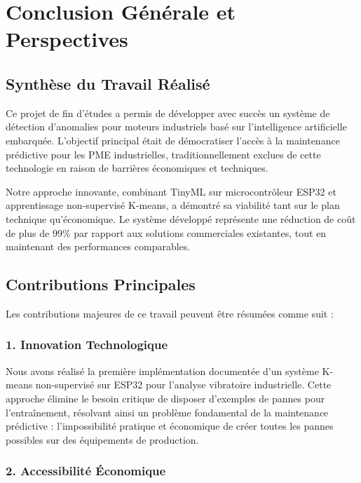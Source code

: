 \chapter*{Conclusion Générale et Perspectives}

\section*{Synthèse du Travail Réalisé}

Ce projet de fin d'études a permis de développer avec succès un système de détection d'anomalies pour moteurs industriels basé sur l'intelligence artificielle embarquée. L'objectif principal était de démocratiser l'accès à la maintenance prédictive pour les PME industrielles, traditionnellement exclues de cette technologie en raison de barrières économiques et techniques.

Notre approche innovante, combinant TinyML sur microcontrôleur ESP32 et apprentissage non-supervisé K-means, a démontré sa viabilité tant sur le plan technique qu'économique. Le système développé représente une réduction de coût de plus de 99\% par rapport aux solutions commerciales existantes, tout en maintenant des performances comparables.

\section*{Contributions Principales}

Les contributions majeures de ce travail peuvent être résumées comme suit :

\subsection*{1. Innovation Technologique}

Nous avons réalisé la première implémentation documentée d'un système K-means non-supervisé sur ESP32 pour l'analyse vibratoire industrielle. Cette approche élimine le besoin critique de disposer d'exemples de pannes pour l'entraînement, résolvant ainsi un problème fondamental de la maintenance prédictive : l'impossibilité pratique et économique de créer toutes les pannes possibles sur des équipements de production.

\subsection*{2. Accessibilité Économique}


